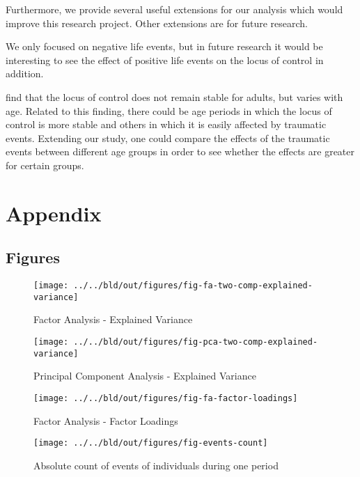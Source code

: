 \documentclass[12pt, a4paper, fleqn, parskip]{scrartcl}
\begin{document}
Furthermore, we provide several useful extensions for our analysis which would
improve this research project. Other extensions are for future research.

We only focused on negative life events, but in future research it would be
interesting to see the effect of positive life events on the locus of control
in addition.

\citet{specht2013} find that the locus of control does not remain stable for
adults, but varies with age. Related to this finding, there could be age
periods in which the locus of control is more stable and others in which it is
easily affected by traumatic events. Extending our study, one could compare the
effects of the traumatic events between different age groups in order to see
whether the effects are greater for certain groups.


\printbibliography

\appendix
\setcounter{secnumdepth}{0}
\section{Appendix}

\subsection{Figures} %
\label{sub:figures}

\begin{figure}[H]
	\centering
	\texttt{[image: ../../bld/out/figures/fig-fa-two-comp-explained-variance]}
	\caption{Factor Analysis - Explained Variance}
	\label{fig:fa_ev}
\end{figure}

\begin{figure}[H]
	\centering
	\texttt{[image: ../../bld/out/figures/fig-pca-two-comp-explained-variance]}
	\caption{Principal Component Analysis - Explained Variance}
	\label{fig:pca_ev}
\end{figure}

\begin{figure}[H]
	\centering
	\texttt{[image: ../../bld/out/figures/fig-fa-factor-loadings]}
	\caption{Factor Analysis - Factor Loadings}
	\label{fig:fa_loadings}
\end{figure}

\begin{figure}[H]
	\centering
	\texttt{[image: ../../bld/out/figures/fig-events-count]}
	\caption{Absolute count of events of individuals during one period}
	\label{fig:events_count}
\end{figure}
\end{document}
